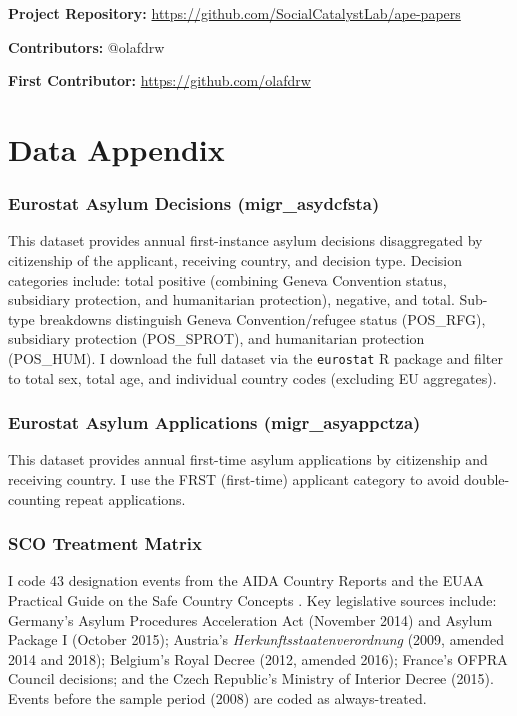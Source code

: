 \documentclass[12pt]{article}
\begin{document}
\noindent\textbf{Project Repository:} \url{https://github.com/SocialCatalystLab/ape-papers}

\noindent\textbf{Contributors:} @olafdrw

\noindent\textbf{First Contributor:} \url{https://github.com/olafdrw}

\label{apep_main_text_end}
\newpage


\newpage
\appendix

\section{Data Appendix}

\subsubsection*{Eurostat Asylum Decisions (migr\_asydcfsta)} This dataset provides annual first-instance asylum decisions disaggregated by citizenship of the applicant, receiving country, and decision type. Decision categories include: total positive (combining Geneva Convention status, subsidiary protection, and humanitarian protection), negative, and total. Sub-type breakdowns distinguish Geneva Convention/refugee status (POS\_RFG), subsidiary protection (POS\_SPROT), and humanitarian protection (POS\_HUM). I download the full dataset via the \texttt{eurostat} R package and filter to total sex, total age, and individual country codes (excluding EU aggregates).

\subsubsection*{Eurostat Asylum Applications (migr\_asyappctza)} This dataset provides annual first-time asylum applications by citizenship and receiving country. I use the FRST (first-time) applicant category to avoid double-counting repeat applications.

\subsubsection*{SCO Treatment Matrix} I code 43 designation events from the AIDA Country Reports \citep{aida2023country} and the EUAA Practical Guide on the Safe Country Concepts \citep{euaa2023guidance}. Key legislative sources include: Germany's Asylum Procedures Acceleration Act (November 2014) and Asylum Package I (October 2015); Austria's \textit{Herkunftsstaatenverordnung} (2009, amended 2014 and 2018); Belgium's Royal Decree (2012, amended 2016); France's OFPRA Council decisions; and the Czech Republic's Ministry of Interior Decree (2015). Events before the sample period (2008) are coded as always-treated.
\end{document}
